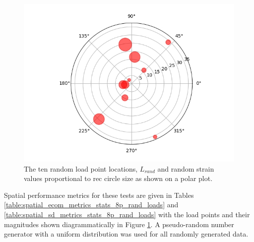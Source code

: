 \begin{figure}[H]
    \centering
    \includegraphics[width=0.7\linewidth]{Figures/rand1_strain_aplc_points.jpg}
    \caption{The ten random load point locations, $L_{rand}$ and random strain values proportional to rec circle size as shown on a polar plot.}
    \label{fig:rand1_load_locs}
\end{figure}

Spatial performance metrics for these tests are given in Tables \ref{table:spatial_ecom_metrics_stats_8p_rand_loads} and \ref{table:spatial_sd_metrics_stats_8p_rand_loads} with the load points and their magnitudes shown diagrammatically in Figure \ref{fig:rand1_load_locs}. A pseudo-random number generator with a uniform distribution was used for all randomly generated data.


